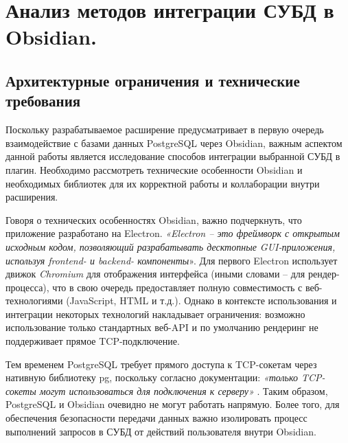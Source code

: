 \documentclass[14pt]{extarticle}
\begin{document}
	
	\newpage
	\section{Анализ методов интеграции СУБД в Obsidian.}
	\subsection{Архитектурные ограничения и технические требования}
	\vspace{1em}
	Поскольку разрабатываемое расширение предусматривает в первую очередь взаимодействие с базами данных PostgreSQL через Obsidian, важным аспектом данной работы является исследование способов интеграции выбранной СУБД в плагин. Необходимо рассмотреть технические особенности Obsidian и необходимых библиотек для их корректной работы и коллаборации внутри расширения.
	\vspace{1em}
	
	Говоря о технических особенностях Obsidian, важно подчеркнуть, что приложение  разработано на Electron. \textit{«Electron – это фреймворк с открытым исходным кодом, позволяющий разрабатывать десктопные GUI-приложения, используя frontend- и backend- компоненты}»\cite{Electron}. Для первого Electron использует движок \textit{Chromium} для отображения интерфейса (иными словами – для рендер-процесса), что в свою очередь предоставляет полную совместимость с веб-технологиями (JavaScript, HTML и т.д.). Однако в контексте использования и интеграции некоторых технологий накладывает ограничения: возможно использование только стандартных веб-API и по умолчанию рендеринг не поддерживает прямое TCP-подключение.
	\vspace{1em}
	
	Тем временем PostgreSQL требует прямого доступа к TCP-сокетам через нативную библиотеку pg, поскольку согласно документации: \textit{«только TCP-сокеты могут использоваться для подключения к серверу»} \cite{pg}. Таким образом, PostgreSQL и Obsidian очевидно не могут работать напрямую. Более того, для обеспечения безопасности передачи данных важно изолировать процесс выполнений запросов в СУБД от действий пользователя внутри Obsidian.
	\vspace{1em}
	
\end{document}
